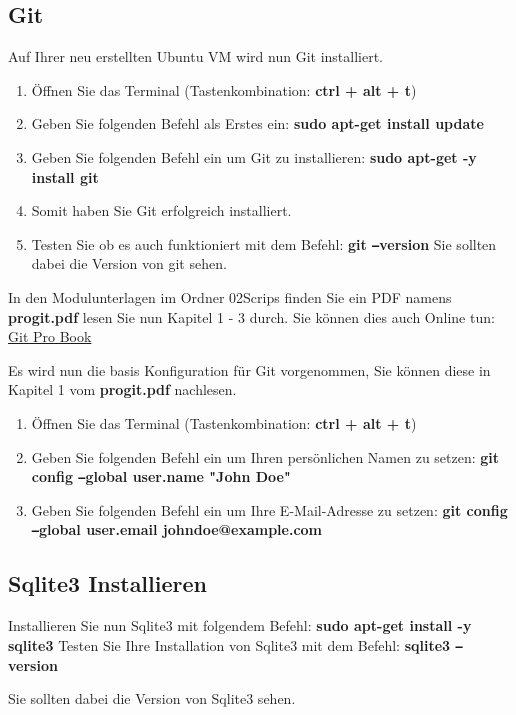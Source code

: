\subsection{Git}\label{subsec:git}
\begin{frame}[fragile]
    Auf Ihrer neu erstellten Ubuntu VM wird nun Git installiert.
    \begin{enumerate}
        \item Öffnen Sie das Terminal (Tastenkombination: \textbf{ctrl + alt + t})
        \item Geben Sie folgenden Befehl als Erstes ein: \textbf{sudo apt-get install update}
        \item Geben Sie folgenden Befehl ein um Git zu installieren: \textbf{sudo apt-get -y install git}
        \item Somit haben Sie Git erfolgreich installiert.
        \item Testen Sie ob es auch funktioniert mit dem Befehl: \textbf{git \texttt{--}version} Sie sollten dabei
        die Version von git sehen.
    \end{enumerate}
    In den Modulunterlagen im Ordner 02\textunderscore Scrips finden Sie ein PDF namens \textbf{progit.pdf} lesen Sie nun
    Kapitel 1 - 3 durch.
    Sie können dies auch Online tun: \href{https://git-scm.com/book/en/v2}{Git Pro Book}

    Es wird nun die basis Konfiguration für Git vorgenommen, Sie können diese in Kapitel 1 vom \textbf{progit.pdf} nachlesen.
    \begin{enumerate}
        \item Öffnen Sie das Terminal (Tastenkombination: \textbf{ctrl + alt + t})
        \item Geben Sie folgenden Befehl ein um Ihren persönlichen Namen zu setzen: \newline\textbf{git config \texttt{--}global user.name "John Doe"}
        \item Geben Sie folgenden Befehl ein um Ihre E-Mail-Adresse zu setzen: \newline\textbf{git config \texttt{--}global user.email johndoe@example.com}
    \end{enumerate}
\end{frame}

\subsection{Sqlite3 Installieren}\label{subsec:sqlite3}
\begin{frame}[fragile]
    Installieren Sie nun Sqlite3 mit folgendem Befehl: \textbf{sudo apt-get install -y sqlite3}\newline
    Testen Sie Ihre Installation von Sqlite3 mit dem Befehl: \textbf{sqlite3 \texttt{--}version}

    Sie sollten dabei die Version von Sqlite3 sehen.
\end{frame}

